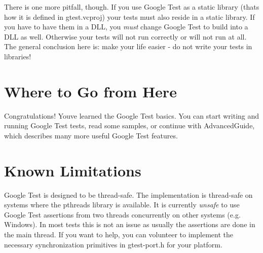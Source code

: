 There is one more pitfall, though. If you use Google Test as a static library (that\textquotesingle{}s how it is defined in gtest.\+vcproj) your tests must also reside in a static library. If you have to have them in a D\+LL, you {\itshape must} change Google Test to build into a D\+LL as well. Otherwise your tests will not run correctly or will not run at all. The general conclusion here is\+: make your life easier -\/ do not write your tests in libraries!

\section*{Where to Go from Here}

Congratulations! You\textquotesingle{}ve learned the Google Test basics. You can start writing and running Google Test tests, read some samples, or continue with Advanced\+Guide, which describes many more useful Google Test features.

\section*{Known Limitations}

Google Test is designed to be thread-\/safe. The implementation is thread-\/safe on systems where the {\ttfamily pthreads} library is available. It is currently {\itshape unsafe} to use Google Test assertions from two threads concurrently on other systems (e.\+g. Windows). In most tests this is not an issue as usually the assertions are done in the main thread. If you want to help, you can volunteer to implement the necessary synchronization primitives in {\ttfamily gtest-\/port.\+h} for your platform. 